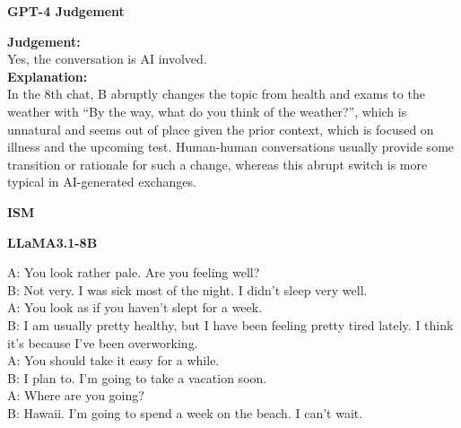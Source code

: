 \documentclass[25pt, a0paper, landscape]{tikzposter}
\begin{document}
\begin{columns}
{\begin{center}
\begin{minipage}[t]{0.485\linewidth}
\begin{caseouterbox}
						\begin{casejudgebox}
							\begin{center}
								\textcolor{CaseGreen}{\textbf{GPT-4 Judgement}}
							\end{center}
							\textcolor{CaseBlue}{\textbf{Judgement:}}\\
							Yes, the conversation is AI involved.\\
							\textcolor{CaseBlue}{\textbf{Explanation:}}\\
							In the 8th chat, B abruptly changes the topic from health and exams to the weather with ``By the way, what do you think of the weather?'', which is unnatural and seems out of place given the prior context, which is focused on illness and the upcoming test. Human-human conversations usually provide some transition or rationale for such a change, whereas this abrupt switch is more typical in AI-generated exchanges.
						\end{casejudgebox}
					\end{caseouterbox}
				\end{minipage}\hfill
				\begin{minipage}[t]{0.485\linewidth}
					\begin{caseouterbox}
						\begin{center}
							\textbf{\Large ISM}
						\end{center}
						\begin{casedialogbox}
							\begin{center}
								\textcolor{CaseGreen}{\textbf{LLaMA3.1-8B}}
							\end{center}
							A: You look rather pale. Are you feeling well?\\
							B: Not very. I was sick most of the night. I didn't sleep very well.\\
							A: You look as if you haven't slept for a week.\\
							B: I am usually pretty healthy, but I have been feeling pretty tired lately. I think it's because I've been overworking.\\
							A: You should take it easy for a while.\\
							B: I plan to. I'm going to take a vacation soon.\\
							A: Where are you going?\\
							B: Hawaii. I'm going to spend a week on the beach. I can't wait.
						\end{casedialogbox}
						

\end{caseouterbox}
\end{minipage}
\end{center}}
\end{columns}
\end{document}
